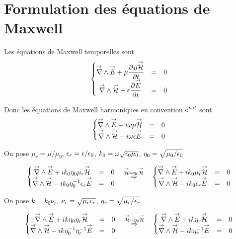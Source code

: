 \section{Formulation des équations de Maxwell}
\label{sec:annex:maxwell_equation}

Les équations de Maxwell temporelles sont
\begin{equation}
  \left\lbrace \begin{matrix}
  \vrot \vE + \mu \ddr{t}{\mu \vH} &=& 0 \\
  \vrot \vH - \eps \ddr{t}{\vE} &=& 0 \\
  \end{matrix} \right.
\end{equation}

Donc les équations de Maxwell harmoniques en convention \(e^{i\w t}\) sont
\begin{equation}
  \left\lbrace \begin{matrix}
  \vrot \vE + i\w\mu \vH &=& 0 \\
  \vrot \vH - i\w\eps \vE &=& 0 \\
  \end{matrix} \right.
\end{equation}

On pose \(\mu_r = \mu \slash \mu_0\), \(\eps_r = \eps \slash \eps_0\), \(k_0 = \w \sqrt {\eps_0\mu_0}\), \(\eta_0=\sqrt {\mu_0/\eps_0}\)

\begin{equation}
\left\lbrace \begin{matrix}
\vrot \vE + ik_0\eta_0\mu_r \vH &=& 0 \\
\vrot \vH - ik_0\eta_0^{-1}\eps_r \vE &=& 0 \\
\end{matrix} \right.
\quad
\overset{\mathcal{\vH} = \eta_0 \vH}{\Rightarrow}
\quad
\left\lbrace \begin{matrix}
\vrot \vE + ik_0\mu_r \mathcal{\vH} &=& 0 \\
\vrot \mathcal{\vH} - ik_0\eps_r \vE &=& 0 \\
\end{matrix} \right.
\end{equation}

On pose \(k=k_0\nu_r\), \(\nu_r = \sqrt{\mu_r\eps_r}\), \(\eta_r = \sqrt{\mu_r \slash \eps_r}\)

\begin{equation}
\left\lbrace \begin{matrix}
\vrot \vE + ik\eta_0\eta_r \vH &=& 0 \\
\vrot \vH - ik\eta_0^{-1}\eta_r^{-1} \vE &=& 0 \\
\end{matrix} \right.
\quad
\overset{\mathcal{\vH} = \eta_0 \vH}{\Rightarrow}
\quad
\left\lbrace \begin{matrix}
\vrot \vE + ik\eta_r \mathcal{\vH} &=& 0 \\
\vrot \mathcal{\vH} - ik\eta_r^{-1} \vE &=& 0 \\
\end{matrix} \right.
\end{equation}